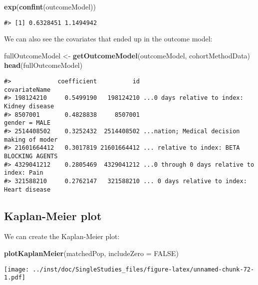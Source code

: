 \documentclass[]{article}
\newenvironment{Shaded}{\begin{snugshade}}{\end{snugshade}}
\newcommand{\DataTypeTok}[1]{\textcolor[rgb]{0.13,0.29,0.53}{#1}}
\newcommand{\KeywordTok}[1]{\textcolor[rgb]{0.13,0.29,0.53}{\textbf{#1}}}
\newcommand{\NormalTok}[1]{#1}
\newcommand{\OtherTok}[1]{\textcolor[rgb]{0.56,0.35,0.01}{#1}}
\newcommand{\StringTok}[1]{\textcolor[rgb]{0.31,0.60,0.02}{#1}}
\begin{document}
\begin{Shaded}
\begin{Highlighting}[]
\KeywordTok{exp}\NormalTok{(}\KeywordTok{confint}\NormalTok{(outcomeModel))}
\end{Highlighting}
\end{Shaded}

\begin{verbatim}
#> [1] 0.6328451 1.1494942
\end{verbatim}

We can also see the covariates that ended up in the outcome model:

\begin{Shaded}
\begin{Highlighting}[]
\NormalTok{fullOutcomeModel <-}\StringTok{ }\KeywordTok{getOutcomeModel}\NormalTok{(outcomeModel, cohortMethodData)}
\KeywordTok{head}\NormalTok{(fullOutcomeModel)}
\end{Highlighting}
\end{Shaded}

\begin{verbatim}
#>             coefficient          id                               covariateName
#> 198124210     0.5499190   198124210 ...0 days relative to index: Kidney disease
#> 8507001       0.4828838     8507001                               gender = MALE
#> 2514408502    0.3252432  2514408502 ...nation; Medical decision making of moder
#> 21601664412   0.3017819 21601664412 ... relative to index: BETA BLOCKING AGENTS
#> 4329041212    0.2805469  4329041212 ...0 through 0 days relative to index: Pain
#> 321588210     0.2762147   321588210 ... 0 days relative to index: Heart disease
\end{verbatim}

\hypertarget{kaplan-meier-plot}{%
\subsection{Kaplan-Meier plot}\label{kaplan-meier-plot}}

We can create the Kaplan-Meier plot:

\begin{Shaded}
\begin{Highlighting}[]
\KeywordTok{plotKaplanMeier}\NormalTok{(matchedPop, }\DataTypeTok{includeZero =} \OtherTok{FALSE}\NormalTok{)}
\end{Highlighting}
\end{Shaded}

\texttt{[image: ../inst/doc/SingleStudies\_files/figure-latex/unnamed-chunk-72-1.pdf]}
\end{document}
